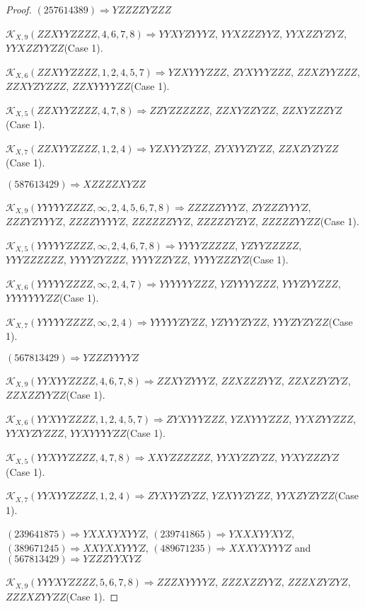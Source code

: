 \documentclass[12pt]{article}
\theoremstyle{plain}
\theoremstyle{definition}
\theoremstyle{remark}
\newcommand{\fancy}[1]{\mathcal{#1}}
\def\K{\fancy{K}}
\begin{document}
\begin{proof}
	
	
	$(2 5 7 6 1 4 3 8 9)\Rightarrow YZZZZYZZZ$
	
	
	$\K_{X,9}(ZZXYYZZZZ,4, 6, 7, 8)\Rightarrow $$YYXYZYYYZ$, $YYXZZZYYZ$, $YYXZZYZYZ$, $YYXZZYYZZ$(Case 1).
	
	$\K_{X,6}(ZZXYYZZZZ,1, 2, 4, 5, 7)\Rightarrow $$YZXYYYZZZ$, $ZYXYYYZZZ$, $ZZXZYYZZZ$, $ZZXYZYZZZ$, $ZZXYYYYZZ$(Case 1).
	
	$\K_{X,5}(ZZXYYZZZZ,4, 7, 8)\Rightarrow $$ZZYZZZZZZ$, $ZZXYZZYZZ$, $ZZXYZZZYZ$(Case 1).
	
	$\K_{X,7}(ZZXYYZZZZ,1, 2, 4)\Rightarrow $$YZXYYZYZZ$, $ZYXYYZYZZ$, $ZZXZYZYZZ$(Case 1).
	
	
	
	$(5 8 7 6 1 3 4 2 9)\Rightarrow XZZZZXYZZ$
	
	
	$\K_{X,9}(YYYYYZZZZ,\infty,2, 4, 5, 6, 7, 8)\Rightarrow $$ZZZZZYYYZ$, $ZYZZZYYYZ$, $ZZZYZYYYZ$, $ZZZZYYYYZ$, $ZZZZZZYYZ$, $ZZZZZYZYZ$, $ZZZZZYYZZ$(Case 1).
	
	$\K_{X,5}(YYYYYZZZZ,\infty,2, 4, 6, 7, 8)\Rightarrow $$YYYYZZZZZ$, $YZYYZZZZZ$, $YYYZZZZZZ$, $YYYYZYZZZ$, $YYYYZZYZZ$, $YYYYZZZYZ$(Case 1).
	
	$\K_{X,6}(YYYYYZZZZ,\infty,2, 4, 7)\Rightarrow $$YYYYYYZZZ$, $YZYYYYZZZ$, $YYYZYYZZZ$, $YYYYYYYZZ$(Case 1).
	
	$\K_{X,7}(YYYYYZZZZ,\infty,2, 4)\Rightarrow $$YYYYYZYZZ$, $YZYYYZYZZ$, $YYYZYZYZZ$(Case 1).
	
	
	
	$(5 6 7 8 1 3 4 2 9)\Rightarrow YZZZYYYYZ$
	
	
	$\K_{X,9}(YYXYYZZZZ,4, 6, 7, 8)\Rightarrow $$ZZXYZYYYZ$, $ZZXZZZYYZ$, $ZZXZZYZYZ$, $ZZXZZYYZZ$(Case 1).
	
	$\K_{X,6}(YYXYYZZZZ,1, 2, 4, 5, 7)\Rightarrow $$ZYXYYYZZZ$, $YZXYYYZZZ$, $YYXZYYZZZ$, $YYXYZYZZZ$, $YYXYYYYZZ$(Case 1).
	
	$\K_{X,5}(YYXYYZZZZ,4, 7, 8)\Rightarrow $$XXYZZZZZZ$, $YYXYZZYZZ$, $YYXYZZZYZ$(Case 1).
	
	$\K_{X,7}(YYXYYZZZZ,1, 2, 4)\Rightarrow $$ZYXYYZYZZ$, $YZXYYZYZZ$, $YYXZYZYZZ$(Case 1).
	
	
	
	$(2 3 9 6 4 1 8 7 5)\Rightarrow YXXXYXYYZ$, $(2 3 9 7 4 1 8 6 5)\Rightarrow YXXXYYXYZ$, $(3 8 9 6 7 1 2 4 5)\Rightarrow XXYXXYYYZ$, $(4 8 9 6 7 1 2 3 5)\Rightarrow XXXYXYYYZ$ and $(5 6 7 8 1 3 4 2 9)\Rightarrow YZZZYYXYZ$
	
	
	$\K_{X,9}(YYYXYZZZZ,5, 6, 7, 8)\Rightarrow $$ZZZXYYYYZ$, $ZZZXZZYYZ$, $ZZZXZYZYZ$, $ZZZXZYYZZ$(Case 1).
	

\end{proof}
\end{document}
